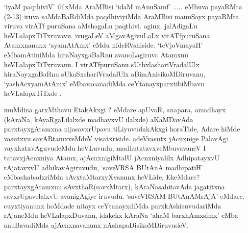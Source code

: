 \begin{center}


\end{center}

\begin{artha}
`iyaM paqthiviV' ililxMda AraMBisi `idaM mAnuSamf' ..... eMbuva \-payaRMta (2-13) iruva saMdaBaRdiMda paqdhiviyiMda AraMBisi manuSayx \-payaRMta viruva virATf puruSana aMshagaLu paqthivi. aginx. jalAdigaLu \break	 heVLalapxTiTxruvavu. ivugaLeV aMgavAgivuLaLx virATfpuruSana Atamxnanunx \break `ayamAtAmx' eMdu nideRVshiside. `teVjoVmayaH' eMbamAtiniMda hiraNayxgaBaRnu avanoLagiruva Atamxnu heVLalapxTiTxruvanu. I virATfpuruSanu sUthxlashariVradalUlx hiraNayxgaBaRnu sUkaSxshariVradalUlx aBimAnisikoMDiruvanu, `yashAcxyamAtAmx' eMbavacanadiMda ceYtanayxparxtibiMbavu heVLalapxTiTxde .
\end{artha}

\begin{artha}
 muMdina garxMthavu EtakAkxgi ? eMdare apUvaR, anapara, amadhayx (kAraNa, kAyaRgaLilalxde madhayxvU ilalxde) aKaMDavAda parxtayxgAtamxna nijasavxrUpavu tiLiyu\-vudakAkxgi horaTide, Adare hiMde vasutxvu savARtamxveMdeV visatxriside. adeVvasutx jAcnxnige PalavAgi vayxkatxvAguvudeMdu heVLuvudu, madhutatavxveMbuvavaneV I tatavx\-jAcnxniya Atamx, ajAcnxnigiMtalU jAcnxniyalilx AdhipatayxvU rAjatavxvU adhikavAgi\-ruvudu, `saveVRSA BUtAnA madhipatiH' eMbashabadxriMda sAvxtaMtarxyXvanunx heVLide, EkeMdare? parxtayxgAtamxnu sAvxthaR(savxMtarx), kAraNasahitavAda jagatitxna savxrUpavelalxvU avanigAgiye iruvudu. 
 `saveVRSAM BUtAnAMrAjA' eMdare. cuyxtiyanunx hoMdade nitayx ceYtanayxdiMda parxkAshisuvudariMda rAjaneMdu heVLalapxDuvanu, idakekx kAraNa `ahaM barxhAmxsimx' eMba anuBavadiMda ajAcnxnavanunx nAshapaDisikoMDiruvudeV.
\end{artha}

